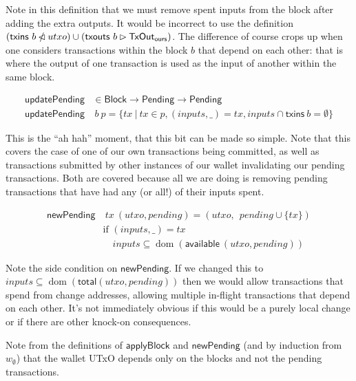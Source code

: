 \documentclass{article}
\DeclareMathOperator{\dom}{dom}
\newcommand{\restrictdom}{\lhd}
\newcommand{\subtractdom}{\mathbin{\slashed{\restrictdom}}}
\newcommand{\restrictrange}{\rhd}
\begin{document}
Note in this definition that we must remove spent inputs from the block after
adding the extra outputs. It would be incorrect to use the definition $(\mathsf{txins} ~ b \subtractdom utxo)  \cup (\mathsf{txouts} ~ b \restrictrange \mathsf{TxOut_{ours}})$.
The difference of course crops up when one considers transactions within the
block $b$ that depend on each other: that is where the output of one transaction
is used as the input of another within the same block.

\begin{equation}
\begin{split}
\mathsf{updatePending} & \in \mathsf{Block} \to \mathsf{Pending} \to \mathsf{Pending} \\
\mathsf{updatePending} & ~ b ~ p = \{ tx ~|~ tx \in p, (inputs, \_) = tx, inputs \cap \mathsf{txins} ~ b = \emptyset \}
\end{split}
\end{equation}

This is the ``ah hah'' moment, that this bit can be made so simple. Note that
this covers the case of one of our own transactions being committed, as well as
transactions submitted by other instances of our wallet invalidating our
pending transactions. Both are covered because all we are doing is removing
pending transactions that have had any (or all!) of their inputs spent.

\begin{equation}
\begin{split}
\mathsf{newPending} & ~ tx ~ (utxo, pending) = ( utxo, ~~ pending \cup \{ tx \} ) \\
                    & \text{if } (inputs, \_) = tx \\
                    & \quad inputs \subseteq \dom (\mathsf{available} ~ (utxo, pending))
\end{split}
\end{equation}

Note the side condition on $\mathsf{newPending}$. If we changed this to
$inputs \subseteq \dom (\mathsf{total}(utxo, pending))$ then we would allow transactions
that spend from change addresses, allowing multiple in-flight transactions
that depend on each other. It's not immediately obvious if this would be a
purely local change or if there are other knock-on consequences.

Note from the definitions of $\mathsf{applyBlock}$ and $\mathsf{newPending}$
(and by induction from $w_\emptyset$) that the wallet UTxO depends only on the
blocks and not the pending transactions.
\end{document}
